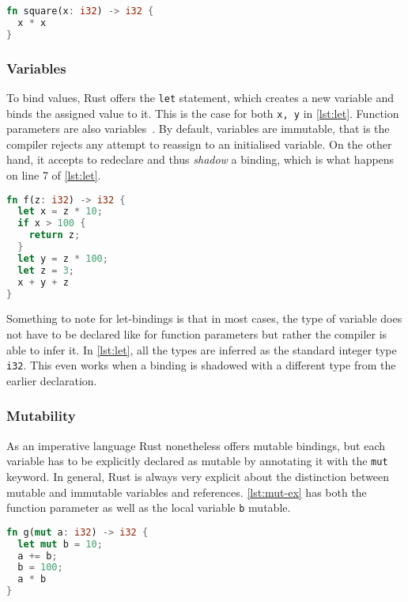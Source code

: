 \begin{lstlisting}[language=Rust, caption={A simple Rust function.}, label=lst:first-ex]
fn square(x: i32) -> i32 {
  x * x
}
\end{lstlisting}

\subsubsection{Variables}

To bind values, Rust offers the \lstinline!let! statement, which creates a new
variable and binds the assigned value to it. This is the case for both
\lstinline!x, y! in \autoref{lst:let}. Function parameters are also
variables~\cite{rustref}. By default, variables are
immutable, that is the compiler rejects any attempt to reassign to an
initialised variable. On the other hand, it accepts to redeclare and thus
\emph{shadow} a binding, which is what happens on line 7 of \autoref{lst:let}.

\begin{lstlisting}[language=Rust, caption={A Rust function doing some arithmetics.}, label=lst:let]
fn f(z: i32) -> i32 {
  let x = z * 10;
  if x > 100 {
    return z;
  }
  let y = z * 100;
  let z = 3;
  x + y + z
}
\end{lstlisting}

Something to note for let-bindings is that in most cases, the type of variable
does not have to be declared like for function parameters but rather the
compiler is able to infer it. In \autoref{lst:let}, all the types are inferred
as the standard integer type \lstinline!i32!. This even works when a binding is
shadowed with a different type from the earlier declaration.

\subsubsection{Mutability}

As an imperative language Rust nonetheless offers mutable bindings, but each
variable has to be explicitly declared as mutable by annotating it with the
\lstinline!mut! keyword. In general, Rust is always very explicit about the
distinction between mutable and immutable variables and references.
\autoref{lst:mut-ex} has both the function parameter as well as the local
variable \lstinline!b! mutable.

\begin{lstlisting}[language=Rust, caption={Mutable variable bindings.}, label=lst:mut-ex]
fn g(mut a: i32) -> i32 {
  let mut b = 10;
  a += b;
  b = 100;
  a * b
}
\end{lstlisting}

